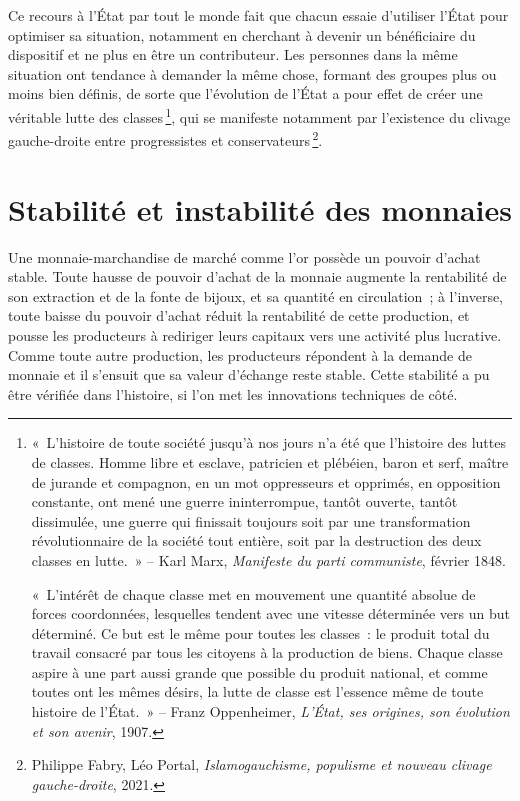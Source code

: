 \documentclass[a4paper,notitlepage]{article}
\newcommand{\eng}[1]{{\NoAutoSpaceBeforeFDP\emph{#1}}}  %
\newcommand{\sfootnote}{\,\footnote}
\begin{document}
Ce recours à l'État par tout le monde fait que chacun essaie d'utiliser l'État pour optimiser sa situation, notamment en cherchant à devenir un bénéficiaire du dispositif et ne plus en être un contributeur. Les personnes dans la même situation ont tendance à demander la même chose, formant des groupes plus ou moins bien définis, de sorte que l'évolution de l'État a pour effet de créer une véritable lutte des classes\sfootnote{«~L'histoire de toute société jusqu'à nos jours n'a été que l'histoire des luttes de classes. Homme libre et esclave, patricien et plébéien, baron et serf, maître de jurande et compagnon, en un mot oppresseurs et opprimés, en opposition constante, ont mené une guerre ininterrompue, tantôt ouverte, tantôt dissimulée, une guerre qui finissait toujours soit par une transformation révolutionnaire de la société tout entière, soit par la destruction des deux classes en lutte.~» -- Karl Marx, \eng{Manifeste du parti communiste}, février 1848.

«~L'intérêt de chaque classe met en mouvement une quantité absolue de forces coordonnées, lesquelles tendent avec une vitesse déterminée vers un but déterminé. Ce but est le même pour toutes les classes~: le produit total du travail consacré par tous les citoyens à la production de biens. Chaque classe aspire à une part aussi grande que possible du produit national, et comme toutes ont les mêmes désirs, la lutte de classe est l'essence même de toute histoire de l'État.~» -- Franz Oppenheimer, \emph{L'État, ses origines, son évolution et son avenir}, 1907.}, qui se manifeste notamment par l'existence du clivage gauche-droite entre progressistes et conservateurs\sfootnote{Philippe Fabry, Léo Portal, \emph{Islamogauchisme, populisme et nouveau clivage gauche-droite}, 2021.}.

\section{Stabilité et instabilité des monnaies}

Une monnaie-marchandise de marché comme l'or possède un pouvoir d'achat stable. Toute hausse de pouvoir d'achat de la monnaie augmente la rentabilité de son extraction et de la fonte de bijoux, et sa quantité en circulation~; à l'inverse, toute baisse du pouvoir d'achat réduit la rentabilité de cette production, et pousse les producteurs à rediriger leurs capitaux vers une activité plus lucrative. Comme toute autre production, les producteurs répondent à la demande de monnaie et il s'ensuit que sa valeur d'échange reste stable. Cette stabilité a pu être vérifiée dans l'histoire, si l'on met les innovations techniques de côté.
\end{document}
